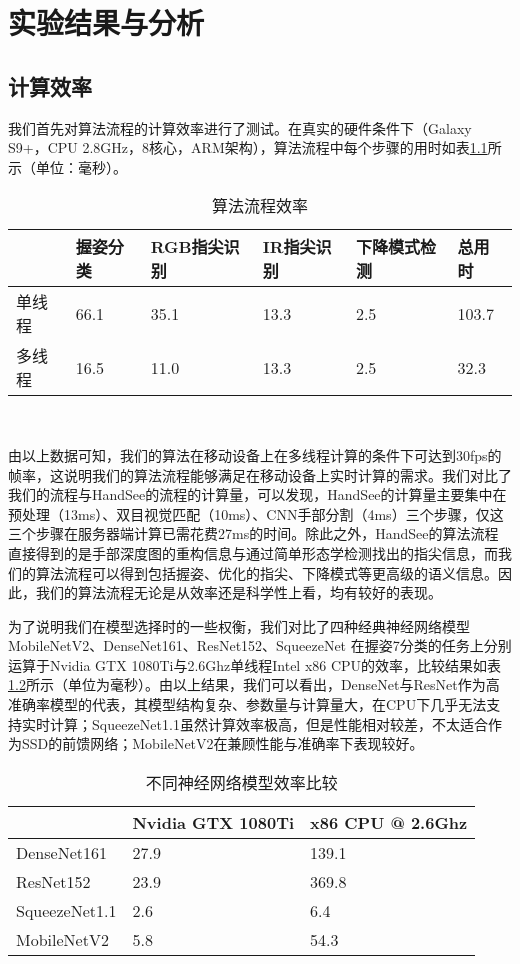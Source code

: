 \chapter{实验结果与分析}

\section{计算效率}

我们首先对算法流程的计算效率进行了测试。在真实的硬件条件下（Galaxy S9+，CPU 2.8GHz，8核心，ARM架构），算法流程中每个步骤的用时如表\ref{tbl:alg_speed}所示（单位：毫秒）。

\begin{table}[htbp]
\centering
\caption{算法流程效率}
\label{tbl:alg_speed}
\begin{tabular}{p{40 pt}p{50 pt}p{70 pt}p{70 pt}p{70 pt}p{40 pt}}
 \toprule
  & 握姿分类 & RGB指尖识别 & IR指尖识别 & 下降模式检测 & 总用时\\
 \midrule
单线程 & 66.1 & 35.1 & 13.3 & 2.5 & 103.7 \\
多线程 & 16.5 & 11.0 & 13.3 & 2.5 & 32.3 \\
\bottomrule
 \end{tabular}\\[2pt]
\end{table}

由以上数据可知，我们的算法在移动设备上在多线程计算的条件下可达到30fps的帧率，这说明我们的算法流程能够满足在移动设备上实时计算的需求。我们对比了我们的流程与HandSee的流程的计算量，可以发现，HandSee的计算量主要集中在预处理（13ms）、双目视觉匹配（10ms）、CNN手部分割（4ms）三个步骤，仅这三个步骤在服务器端计算已需花费27ms的时间。除此之外，HandSee的算法流程直接得到的是手部深度图的重构信息与通过简单形态学检测找出的指尖信息，而我们的算法流程可以得到包括握姿、优化的指尖、下降模式等更高级的语义信息。因此，我们的算法流程无论是从效率还是科学性上看，均有较好的表现。

为了说明我们在模型选择时的一些权衡，我们对比了四种经典神经网络模型MobileNetV2、DenseNet161、ResNet152、SqueezeNet 在握姿7分类的任务上分别运算于Nvidia GTX 1080Ti与2.6Ghz单线程Intel x86 CPU的效率，比较结果如表\ref{tbl:nn_speed}所示（单位为毫秒）。由以上结果，我们可以看出，DenseNet与ResNet作为高准确率模型的代表，其模型结构复杂、参数量与计算量大，在CPU下几乎无法支持实时计算；SqueezeNet1.1虽然计算效率极高，但是性能相对较差，不太适合作为SSD的前馈网络；MobileNetV2在兼顾性能与准确率下表现较好。

\begin{table}[htbp]
\centering
\caption{不同神经网络模型效率比较}
\label{tbl:nn_speed}
\begin{tabular}{p{80 pt}p{100 pt}p{100 pt}}
 \toprule
   & Nvidia GTX 1080Ti & x86 CPU @ 2.6Ghz\\
 \midrule
    DenseNet161 & 27.9 & 139.1 \\
    ResNet152 & 23.9 & 369.8 \\
    SqueezeNet1.1 & 2.6 & 6.4 \\
    MobileNetV2 & 5.8 & 54.3 \\
\bottomrule
 \end{tabular}\\[2pt]
\end{table}


